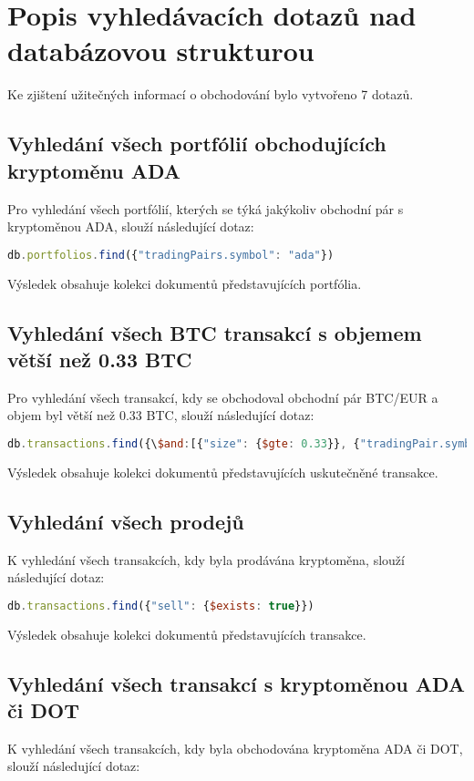 \documentclass[12pt, a4paper]{article}
\let\oldsection\section
\renewcommand\section{\clearpage\oldsection}
\begin{document}
\section{Popis vyhledávacích dotazů nad databázovou strukturou}
Ke zjištení užitečných informací o obchodování bylo vytvořeno 7 dotazů.

\subsection{Vyhledání všech portfólií obchodujících kryptoměnu ADA}
Pro vyhledání všech portfólií, kterých se týká jakýkoliv obchodní pár s kryptoměnou ADA, slouží následující dotaz:

\begin{lstlisting}[language=JavaScript]
db.portfolios.find({"tradingPairs.symbol": "ada"})
\end{lstlisting}
Výsledek obsahuje kolekci dokumentů představujících portfólia.

\subsection{Vyhledání všech BTC transakcí s objemem větší než 0.33 BTC}
Pro vyhledání všech transakcí, kdy se obchodoval obchodní pár BTC/EUR a objem byl větší než 0.33 BTC, slouží následující dotaz:

\begin{lstlisting}[language=JavaScript]
db.transactions.find({\$and:[{"size": {$gte: 0.33}}, {"tradingPair.symbol": "btc"}, {"tradingPair.currency": "eur"}]})

\end{lstlisting}
Výsledek obsahuje kolekci dokumentů představujících uskutečněné transakce.

\subsection{Vyhledání všech prodejů}
K vyhledání všech transakcích, kdy byla prodávána kryptoměna, slouží následující dotaz:

\begin{lstlisting}[language=JavaScript]
db.transactions.find({"sell": {$exists: true}})
\end{lstlisting}
Výsledek obsahuje kolekci dokumentů představujících transakce.


\subsection{Vyhledání všech transakcí s kryptoměnou ADA či DOT}
K vyhledání všech transakcích, kdy byla obchodována kryptoměna ADA či DOT, slouží následující dotaz:
\end{document}
